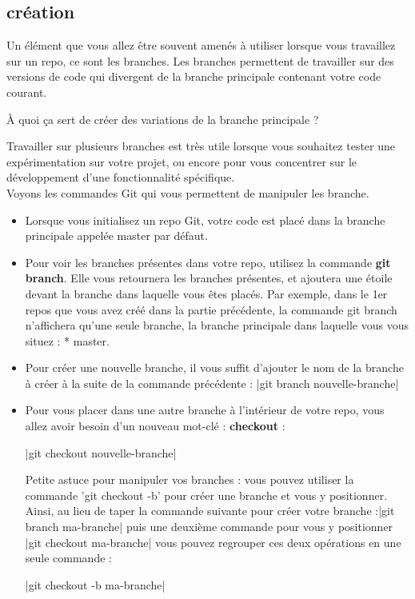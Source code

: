 \subsection{création}
Un élément que vous allez être souvent amenés à utiliser lorsque vous travaillez sur un repo, ce sont les branches. Les branches permettent de travailler sur des versions de code qui divergent de la branche principale contenant votre code courant.\\ 

\begin{remark} 
À quoi ça sert de créer des variations de la branche principale ?\end{remark}

Travailler sur plusieurs branches est très utile lorsque vous souhaitez tester une expérimentation sur votre projet, ou encore pour vous concentrer sur le développement d'une fonctionnalité spécifique.\\

Voyons les commandes Git qui vous permettent de manipuler les branche.
\begin{itemize}
\item  Lorsque vous initialisez un repo Git, votre code est placé dans la branche principale appelée master par défaut.
\item Pour voir les branches présentes dans votre repo, utilisez la commande \textbf{git branch}. Elle vous retournera les branches présentes, et ajoutera une étoile devant la branche dans laquelle vous êtes placés. Par exemple, dans le 1er repos que vous avez créé dans la partie précédente, la commande git branch n'affichera qu'une seule branche, la branche principale dans laquelle vous vous situez : * master. 

\item Pour créer une nouvelle branche, il vous suffit d'ajouter le nom de la branche à créer à la suite de la commande précédente :
|git branch nouvelle-branche|
\item Pour vous placer dans une autre branche à l'intérieur de votre repo, vous allez avoir besoin d'un nouveau mot-clé : \textbf{checkout}  : 

|git checkout nouvelle-branche|
\begin{remark} Petite astuce pour manipuler vos branches : vous pouvez utiliser la commande 'git checkout -b' pour créer une branche et vous y positionner. Ainsi, au lieu de taper la commande suivante pour créer votre branche :|git branch ma-branche|
puis une deuxième commande pour vous y positionner
|git checkout ma-branche|
vous pouvez regrouper ces deux opérations en une seule commande : 

|git checkout -b ma-branche|
\end{remark}
\end{itemize}
 

